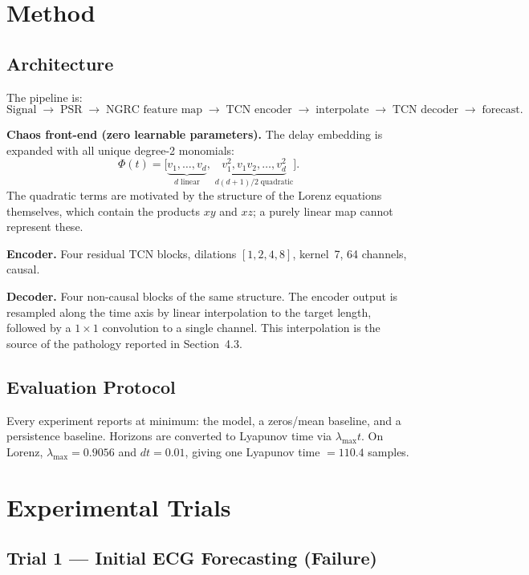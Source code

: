 \documentclass[11pt,a4paper]{article}
\begin{document}
\section{Method}

\subsection{Architecture}

The pipeline is:
\[
\text{Signal} \;\to\; \text{PSR} \;\to\; \text{NGRC feature map} \;\to\; \text{TCN encoder} \;\to\; \text{interpolate} \;\to\; \text{TCN decoder} \;\to\; \text{forecast.}
\]

\textbf{Chaos front-end (zero learnable parameters).}
The delay embedding is expanded with all unique degree-2 monomials:
\begin{equation}
  \Phi(t) = \bigl[\underbrace{v_1, \ldots, v_d}_{d\;\text{linear}},\; \underbrace{v_1^2, v_1 v_2, \ldots, v_d^2}_{d(d+1)/2\;\text{quadratic}}\bigr].
\end{equation}
The quadratic terms are motivated by the structure of the Lorenz equations themselves, which contain the products $xy$ and $xz$; a purely linear map cannot represent these.

\textbf{Encoder.} Four residual TCN blocks, dilations $[1, 2, 4, 8]$, kernel~7, 64 channels, causal.

\textbf{Decoder.} Four non-causal blocks of the same structure.
The encoder output is resampled along the time axis by linear interpolation to the target length, followed by a $1 \times 1$ convolution to a single channel.
This interpolation is the source of the pathology reported in Section~4.3.

\subsection{Evaluation Protocol}

Every experiment reports at minimum: the model, a zeros/mean baseline, and a persistence baseline.
Horizons are converted to Lyapunov time via $\lambda_{\max} t$.
On Lorenz, $\lambda_{\max} = 0.9056$ and $dt = 0.01$, giving one Lyapunov time $= 110.4$ samples.


\section{Experimental Trials}

\subsection{Trial 1 --- Initial ECG Forecasting (Failure)}
\end{document}
